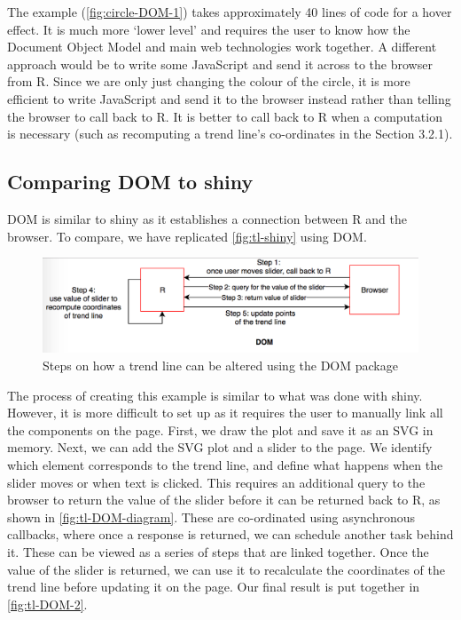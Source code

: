 \documentclass[11pt,]{report}
\begin{document}
The example (\autoref{fig:circle-DOM-1}) takes approximately 40 lines of
code for a hover effect. It is much more `lower level' and requires the
user to know how the Document Object Model and main web technologies
work together. A different approach would be to write some JavaScript
and send it across to the browser from R. Since we are only just
changing the colour of the circle, it is more efficient to write
JavaScript and send it to the browser instead rather than telling the
browser to call back to R. It is better to call back to R when a
computation is necessary (such as recomputing a trend line's
co-ordinates in the Section 3.2.1).

\subsection{Comparing DOM to shiny}\label{comparing-dom-to-shiny}

\textsf{DOM} is similar to \textsf{shiny} as it establishes a connection
between R and the browser. To compare, we have replicated
\autoref{fig:tl-shiny} using \textsf{DOM}.

\begin{figure}[H]

{\centering \includegraphics[width=0.7\linewidth,]{./fig/tl-DOM-diagram} 

}

\caption{\label{fig:tl-DOM-diagram} Steps on how a trend line can be altered using the DOM package}\label{fig:unnamed-chunk-44}
\end{figure}

The process of creating this example is similar to what was done with
\textsf{shiny}. However, it is more difficult to set up as it requires
the user to manually link all the components on the page. First, we draw
the plot and save it as an SVG in memory. Next, we can add the SVG plot
and a slider to the page. We identify which element corresponds to the
trend line, and define what happens when the slider moves or when text
is clicked. This requires an additional query to the browser to return
the value of the slider before it can be returned back to R, as shown in
\autoref{fig:tl-DOM-diagram}. These are co-ordinated using asynchronous
callbacks, where once a response is returned, we can schedule another
task behind it. These can be viewed as a series of steps that are linked
together. Once the value of the slider is returned, we can use it to
recalculate the coordinates of the trend line before updating it on the
page. Our final result is put together in \autoref{fig:tl-DOM-2}.
\end{document}
